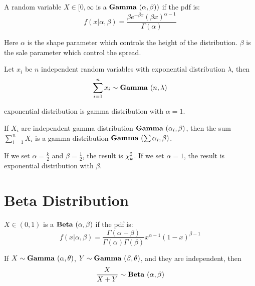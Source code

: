 \begin{definition}
    A random variable $X \in [0,\infty$ is a  $\mathop{\bf Gamma\/}~(\alpha,\beta))$ if the pdf is:
    \begin{equation}
        f(x|\alpha, \beta) = \frac{\beta e^{-\beta x} (\beta x)^{\alpha - 1}}{\Gamma(\alpha)}
    \end{equation}   
    
    Here $\alpha$ is the shape parameter which controls the height of the distribution. $\beta$ is the sale parameter which control the spread.
\end{definition}

\begin{example}
    Let $x_i$ be $n$ independent random variables with exponential distribution $\lambda$, then
    \begin{equation}
        \sum_{i=1}^n x_i \sim \mathop{\bf Gamma\/}~(n,\lambda)
    \end{equation}
    
    exponential distribution is gamma distribution with $\alpha = 1$.
\end{example}

\begin{theorem}
    If $X_i$ are independent gamma distribution $\mathop{\bf Gamma\/}~(\alpha_i,\beta)$, then the sum $\displaystyle \sum_{i=1}^n X_i$ is a gamma distribution $\mathop{\bf Gamma\/}~(\sum \alpha_i,\beta)$.
\end{theorem}


If we set $\alpha = \frac{k}{2}$ and $\beta = \frac{1}{2}$, the result is $\chi^2_{k}$. If we set $\alpha = 1$, the result is exponential distribution with $\beta$.


\section{Beta Distribution}

\begin{definition}
    $X \in (0,1)$ is a  $\mathop{\bf Beta\/}~(\alpha,\beta)$ if the pdf is:
    \begin{equation}
        f(x|\alpha, \beta) = \frac{\Gamma(\alpha + \beta)}{\Gamma(\alpha) \Gamma(\beta)} x^{\alpha - 1} (1-x)^{\beta - 1}
    \end{equation}
    
    If $X \sim \mathop{\bf Gamma\/}~(\alpha,\theta)$, $Y \sim \mathop{\bf Gamma\/}~(\beta,\theta)$, and they are independent, then
    \begin{equation}
        \frac{X}{X+Y} \sim \mathop{\bf Beta\/}~(\alpha,\beta)
    \end{equation}
\end{definition}



